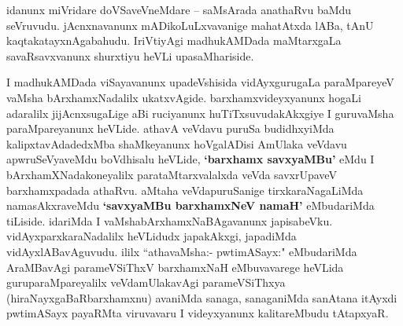 \begin{artha}
idanunx miVridare doVSaveVneMdare -- saMsArada anathaRvu baMdu seVruvudu. jAcnxnavanunx 
mADikoLuLxvavanige mahatAtxda lABa, tAnU kaqtakatayxnAgabahudu. IriVtiyAgi madhukAMDada 
maMtarxgaLa savaRsavxvanunx shurxtiyu heVLi upasaMhariside.
\end{artha}




\centerline{}

\begin{artha}
I madhukAMDada viSayavanunx upadeVshisida vidAyxgurugaLa paraMpareyeV vaMsha bArxhamxNadalilx ukatxvAgide. barxhamxvideyxyanunx hogaLi adaralilx jijAcnxsugaLige aBi ruciyanunx huTiTxsuvudakAkxgiye I guruvaMsha paraMpareyanunx heVLide. athavA veVdavu puruSa budidhxyiMda kalipxtavAdadedxMba shaMkeyanunx hoVgalADisi AmUlaka veVdavu apwruSeVyaveMdu boVdhisalu heVLide, \textbf{`barxhamx savxyaMBu'}  eMdu I bArxhamXNadakoneyalilx parataMtarxvalalxda veVda savxrUpaveV barxhamxpadada athaRvu. aMtaha veVdapuruSanige tirxkaraNagaLiMda namasAkxraveMdu \textbf{`savxyaMBu barxhamxNeV namaH'} eMbudariMda tiLiside. idariMda I vaMshabArxhamxNaBAgavanunx japisabeVku. vidAyxparxkaraNadalilx heVLidudx japakAkxgi, japadiMda vidAyxlABavAguvudu. ililx ``athavaMsha:- pwtimASayx:" eMbudariMda AraMBavAgi parameVSiThxV barxhamxNaH eMbuvavarege heVLida guruparaMpareyalilx veVdamUlakavAgi parameVSiThxya (hiraNayxgaBaRbarxhamxnu) avaniMda sanaga, sanaganiMda sanAtana itAyxdi pwtimASayx payaRMta viruvavaru I videyxyanunx kalitareMbudu tAtapxyaR.
\end{artha}

\centerline{}

